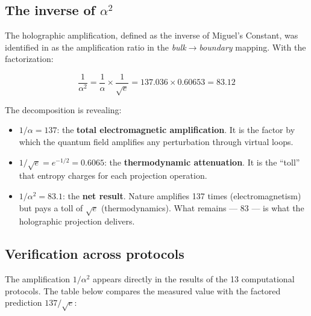 \documentclass[12pt,a4paper,twoside]{article}
\newcommand{\alphaii}{\alpha^{2}}
\newcommand{\boundary}{\textit{boundary}}
\newcommand{\bulk}{\textit{bulk}}
\begin{document}
\subsection{The inverse of $\alphaii$}

The holographic amplification, defined as the inverse of Miguel's Constant, was identified in \cite{Miguel2026Fronteira} as the amplification ratio in the \bulk$\to$\boundary{} mapping. With the factorization:

\begin{equationbox}[title={Decomposed Amplification}]
\begin{equation}
\boxed{\frac{1}{\alphaii} = \frac{1}{\alpha} \times \frac{1}{\sqrt{e}} = 137.036 \times 0.60653 = 83.12}
\label{eq:amplificacao}
\end{equation}
\end{equationbox}

The decomposition is revealing:

\begin{itemize}[nosep]
\item $1/\alpha = 137$: the \textbf{total electromagnetic amplification}. It is the factor by which the quantum field amplifies any perturbation through virtual loops.

\item $1/\sqrt{e} = e^{-1/2} = 0.6065$: the \textbf{thermodynamic attenuation}. It is the ``toll'' that entropy charges for each projection operation.

\item $1/\alphaii = 83.1$: the \textbf{net result}. Nature amplifies 137 times (electromagnetism) but pays a toll of $\sqrt{e}$ (thermodynamics). What remains --- 83 --- is what the holographic projection delivers.
\end{itemize}

\subsection{Verification across protocols}

The amplification $1/\alphaii$ appears directly in the results of the 13 computational protocols. The table below compares the measured value with the factored prediction $137/\sqrt{e}$:
\end{document}
